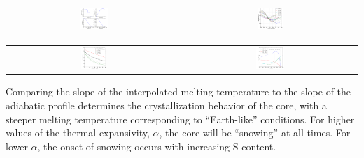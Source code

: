 \documentclass[landscape,a0b,final]{a0poster}
\begin{document}
\begin{multicols}{3}
\begin{center}
\begin{tabular}{cc}
 \includegraphics[width=0.165\textwidth]{profiles.png} &
 \includegraphics[width=0.15\textwidth]{Liquidus_model.png} \\
\end{tabular}
\label{interior_model}
\end{center}


\begin{center}
\begin{tabular}{cc}
 \includegraphics[width=0.15\textwidth]{clapeyron_1.png} &
 \includegraphics[width=0.165\textwidth]{core_energetics.png} \\
\end{tabular}
\label{core_energy}
\end{center}


\columnbreak

Comparing the slope of the interpolated melting temperature to the slope of the
adiabatic profile determines the crystallization behavior of the core, with a
steeper melting temperature corresponding to  ``Earth-like'' conditions. For higher
values of the thermal expansivity, $\alpha$, the core will be ``snowing'' at all
times. For lower $\alpha$, the onset of snowing occurs with increasing S-content.


\end{multicols}
\end{document}
